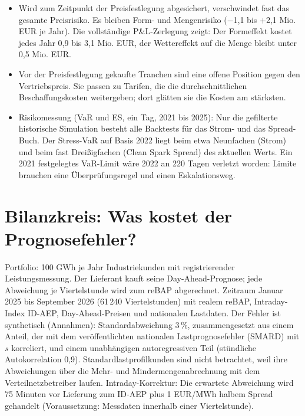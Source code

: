 \documentclass[10pt,a4paper]{article}
\begin{document}
\begin{itemize}
\item Wird zum Zeitpunkt der Preisfestlegung abgesichert, verschwindet fast das gesamte Preisrisiko. Es bleiben
Form- und Mengenrisiko ($-$1,1 bis $+$2,1 Mio. EUR je Jahr). Die vollständige P\&L-Zerlegung zeigt: Der Formeffekt
kostet jedes Jahr 0,9 bis 3,1 Mio. EUR, der Wettereffekt auf die Menge bleibt unter 0,5 Mio. EUR.
\item Vor der Preisfestlegung gekaufte Tranchen sind eine offene Position gegen den Vertriebspreis. Sie passen zu
Tarifen, die die durchschnittlichen Beschaffungskosten weitergeben; dort glätten sie die Kosten am stärksten.
\item Risikomessung (VaR und ES, ein Tag, 2021 bis 2025): Nur die gefilterte historische Simulation besteht alle
Backtests für das Strom- und das Spread-Buch. Der Stress-VaR auf Basis 2022 liegt beim etwa Neunfachen (Strom) und
beim fast Dreißigfachen (Clean Spark Spread) des aktuellen Werts. Ein 2021 festgelegtes VaR-Limit wäre 2022 an
220 Tagen verletzt worden: Limite brauchen eine Überprüfungsregel und einen Eskalationsweg.
\end{itemize}

\section{Bilanzkreis: Was kostet der Prognosefehler?}
Portfolio: 100 GWh je Jahr Industriekunden mit registrierender Leistungsmessung. Der Lieferant kauft seine
Day-Ahead-Prognose; jede Abweichung je Viertelstunde wird zum reBAP abgerechnet. Zeitraum Januar 2025 bis September
2026 (61\,240 Viertelstunden) mit realem reBAP, Intraday-Index ID-AEP, Day-Ahead-Preisen und nationalen Lastdaten.
Der Fehler ist synthetisch (Annahmen): Standardabweichung 3\,\%, zusammengesetzt aus einem Anteil, der mit dem
veröffentlichten nationalen Lastprognosefehler (SMARD) mit $s$ korreliert, und einem unabhängigen autoregressiven
Teil (stündliche Autokorrelation 0,9). Standardlastprofilkunden sind nicht betrachtet, weil ihre Abweichungen über
die Mehr- und Mindermengenabrechnung mit dem Verteilnetzbetreiber laufen. Intraday-Korrektur: Die erwartete
Abweichung wird 75 Minuten vor Lieferung zum ID-AEP plus 1 EUR/MWh halbem Spread gehandelt (Voraussetzung: Messdaten
innerhalb einer Viertelstunde).
\end{document}

